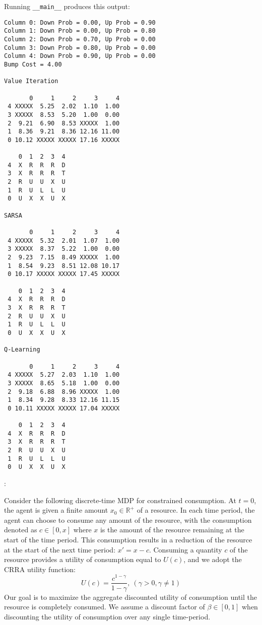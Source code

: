 \documentclass[12pt]{exam}
\begin{document}
\begin{questions}
\begin{solution}
Running \lstinline{__main__} produces this output:

\begin{verbatim}
Column 0: Down Prob = 0.00, Up Prob = 0.90
Column 1: Down Prob = 0.00, Up Prob = 0.80
Column 2: Down Prob = 0.70, Up Prob = 0.00
Column 3: Down Prob = 0.80, Up Prob = 0.00
Column 4: Down Prob = 0.90, Up Prob = 0.00
Bump Cost = 4.00

Value Iteration

       0     1     2     3     4
 4 XXXXX  5.25  2.02  1.10  1.00
 3 XXXXX  8.53  5.20  1.00  0.00
 2  9.21  6.90  8.53 XXXXX  1.00
 1  8.36  9.21  8.36 12.16 11.00
 0 10.12 XXXXX XXXXX 17.16 XXXXX

    0  1  2  3  4
 4  X  R  R  R  D
 3  X  R  R  R  T
 2  R  U  U  X  U
 1  R  U  L  L  U
 0  U  X  X  U  X

SARSA

       0     1     2     3     4
 4 XXXXX  5.32  2.01  1.07  1.00
 3 XXXXX  8.37  5.22  1.00  0.00
 2  9.23  7.15  8.49 XXXXX  1.00
 1  8.54  9.23  8.51 12.08 10.17
 0 10.17 XXXXX XXXXX 17.45 XXXXX

    0  1  2  3  4
 4  X  R  R  R  D
 3  X  R  R  R  T
 2  R  U  U  X  U
 1  R  U  L  L  U
 0  U  X  X  U  X

Q-Learning

       0     1     2     3     4
 4 XXXXX  5.27  2.03  1.10  1.00
 3 XXXXX  8.65  5.18  1.00  0.00
 2  9.18  6.88  8.96 XXXXX  1.00
 1  8.34  9.28  8.33 12.16 11.15
 0 10.11 XXXXX XXXXX 17.04 XXXXX

    0  1  2  3  4
 4  X  R  R  R  D
 3  X  R  R  R  T
 2  R  U  U  X  U
 1  R  U  L  L  U
 0  U  X  X  U  X
\end{verbatim}
\end{solution}


\newpage
{}:

Consider the following discrete-time MDP for constrained consumption. At $t=0$, the agent is given a finite amount $x_0 \in \mathbb{R}^+$ of a resource. In each time period, the agent can choose to consume any amount of the resource, with the consumption denoted as $c \in [0, x]$ where $x$ is the amount of the resource remaining at the start of the time period. This consumption results in a reduction of the resource at the start of the next time period: $x' = x - c$. Consuming a quantity $c$ of the resource provides a utility of consumption equal to $U(c)$, and we adopt the CRRA utility function:
\[U(c) = \frac{c^{1-\gamma}}{1-\gamma},\ (\gamma > 0, \gamma \neq 1)\]
    Our goal is to maximize the aggregate discounted utility of consumption until the resource is completely consumed. We assume a discount factor of $\beta \in [0,1]$ when discounting the utility of consumption over any single time-period.
    

\end{questions}
\end{document}
